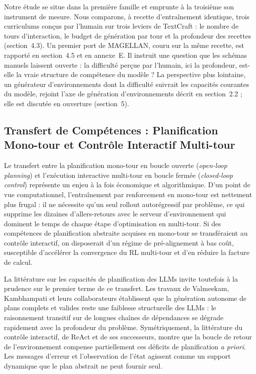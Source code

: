 \documentclass[11pt,a4paper]{article}
\begin{document}
Notre étude se situe dans la première famille et emprunte à la troisième son instrument de mesure. Nous comparons, à recette d'entraînement identique, trois curriculums conçus par l'humain sur trois leviers de TextCraft : le nombre de tours d'interaction, le budget de génération par tour et la profondeur des recettes (section~4.3). Un premier port de MAGELLAN, couru sur la même recette, est rapporté en section~4.5 et en annexe~E. Il instruit une question que les schémas manuels laissent ouverte : la difficulté perçue par l'humain, ici la profondeur, est-elle la vraie structure de compétence du modèle ? La perspective plus lointaine, un générateur d'environnements dont la difficulté suivrait les capacités courantes du modèle, rejoint l'axe de génération d'environnements décrit en section~2.2 ; elle est discutée en ouverture (section~5).





\subsection{Transfert de Compétences : Planification Mono-tour et Contrôle Interactif Multi-tour}


Le transfert entre la planification mono-tour en boucle ouverte (\emph{open-loop planning}) et l'exécution interactive multi-tour en boucle fermée (\emph{closed-loop control}) représente un enjeu à la fois économique et algorithmique. D'un point de vue computationnel, l'entraînement par renforcement en mono-tour est nettement plus frugal : il ne nécessite qu'un seul rollout autorégressif par problème, ce qui supprime les dizaines d'allers-retours avec le serveur d'environnement qui dominent le temps de chaque étape d'optimisation en multi-tour. Si des compétences de planification abstraite acquises en mono-tour se transféraient au contrôle interactif, on disposerait d'un régime de pré-alignement à bas coût, susceptible d'accélérer la convergence du RL multi-tour et d'en réduire la facture de calcul.

La littérature sur les capacités de planification des LLMs invite toutefois à la prudence sur le premier terme de ce transfert. Les travaux de Valmeekam, Kambhampati et leurs collaborateurs \cite{valmeekam2023planning, kambhampati2024llmmodulo} établissent que la génération autonome de plans complets et valides reste une faiblesse structurelle des LLMs : le raisonnement transitif sur de longues chaînes de dépendances se dégrade rapidement avec la profondeur du problème. Symétriquement, la littérature du contrôle interactif, de ReAct \cite{yao2023react} et de ses successeurs, montre que la boucle de retour de l'environnement compense partiellement ces déficits de planification \emph{a priori}. Les messages d'erreur et l'observation de l'état agissent comme un support dynamique que le plan abstrait ne peut fournir seul.
\end{document}
